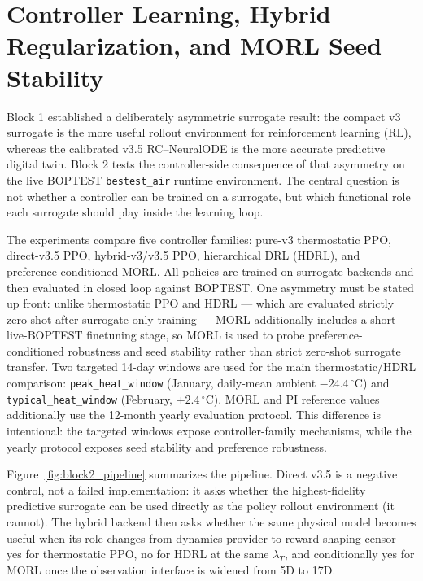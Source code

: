 \documentclass[11pt,a4paper]{article}
\begin{document}
\setcounter{section}{4}
\section{Controller Learning, Hybrid Regularization, and MORL Seed Stability}
\label{sec:results2-control}

Block 1 established a deliberately asymmetric surrogate result: the compact v3 surrogate is the more useful rollout environment for reinforcement learning (RL), whereas the calibrated v3.5 RC--NeuralODE is the more accurate predictive digital twin. Block 2 tests the controller-side consequence of that asymmetry on the live BOPTEST \texttt{bestest\_air} runtime environment. The central question is not whether a controller can be trained on a surrogate, but which functional role each surrogate should play inside the learning loop.

The experiments compare five controller families: pure-v3 thermostatic PPO, direct-v3.5 PPO, hybrid-v3/v3.5 PPO, hierarchical DRL (HDRL), and preference-conditioned MORL. All policies are trained on surrogate backends and then evaluated in closed loop against BOPTEST. One asymmetry must be stated up front: unlike thermostatic PPO and HDRL --- which are evaluated strictly zero-shot after surrogate-only training --- MORL additionally includes a short live-BOPTEST finetuning stage, so MORL is used to probe preference-conditioned robustness and seed stability rather than strict zero-shot surrogate transfer. Two targeted 14-day windows are used for the main thermostatic/HDRL comparison: \texttt{peak\_heat\_window} (January, daily-mean ambient $-24.4\,^\circ$C) and \texttt{typical\_heat\_window} (February, $+2.4\,^\circ$C). MORL and PI reference values additionally use the 12-month yearly evaluation protocol. This difference is intentional: the targeted windows expose controller-family mechanisms, while the yearly protocol exposes seed stability and preference robustness.

Figure~\ref{fig:block2_pipeline} summarizes the pipeline. Direct v3.5 is a negative control, not a failed implementation: it asks whether the highest-fidelity predictive surrogate can be used directly as the policy rollout environment (it cannot). The hybrid backend then asks whether the same physical model becomes useful when its role changes from dynamics provider to reward-shaping censor --- yes for thermostatic PPO, no for HDRL at the same $\lambda_T$, and conditionally yes for MORL once the observation interface is widened from 5D to 17D.
\end{document}
